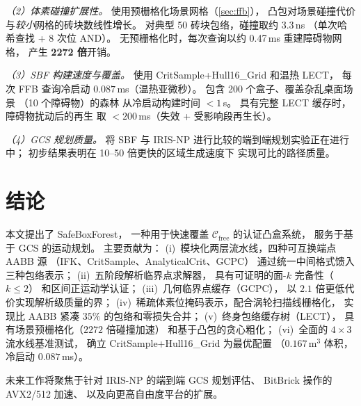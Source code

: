 \documentclass[journal]{IEEEtran}
\newcommand{\Cfree}{\mathcal{C}_\text{free}}
\begin{document}
\emph{（2）体素碰撞扩展性。}
使用预栅格化场景网格（\cref{sec:ffb}），
凸包对场景碰撞代价与\emph{较小}网格的砖块数线性增长。
对典型 50 砖块包络，碰撞取约 3.3\,ns
（单次哈希查找 + 8 次位 AND）。
无预栅格化时，每次查询以约 0.47\,ms 重建障碍物网格，
产生 \textbf{2272 倍}开销。

\emph{（3）SBF 构建速度与覆盖。}
使用 CritSample+Hull16\_Grid 和温热 LECT，
每次 FFB 查询冷启动 $0.087$\,ms（温热亚微秒）。
包含 200 个盒子、覆盖杂乱桌面场景
（10 个障碍物）的森林
从冷启动构建时间 $< 1$\,s。
具有完整 LECT 缓存时，障碍物扰动后的再生
取 $< 200$\,ms（失效 + 受影响段再生长）。

\emph{（4）GCS 规划质量。}
将 SBF 与 IRIS-NP 进行比较的端到端规划实验正在进行中；
初步结果表明在 10--50 倍更快的区域生成速度下
实现可比的路径质量。

\section{结论}\label{sec:conclusion}

本文提出了 SafeBoxForest，
一种用于快速覆盖 $\Cfree$ 的认证凸盒系统，
服务于基于 GCS 的运动规划。
主要贡献为：
(i)~模块化两层流水线，四种可互换端点 AABB 源
（IFK、CritSample、AnalyticalCrit、GCPC）
通过统一中间格式馈入三种包络表示；
(ii)~五阶段解析临界点求解器，
具有可证明的面-$k$ 完备性（$k \leq 2$）
和区间正运动学认证；
(iii)~几何临界点缓存（GCPC），
以 $2.1$ 倍更低代价实现解析级质量的界；
(iv)~稀疏体素位掩码表示，配合涡轮扫描线栅格化，
实现比 AABB 紧凑 $35\%$ 的包络和零损失合并；
(v)~终身包络缓存树（LECT），
具有场景预栅格化（$2272$ 倍碰撞加速）
和基于凸包的贪心粗化；
(vi)~全面的 $4{\times}3$ 流水线基准测试，
确立 CritSample+Hull16\_Grid 为最优配置
（$0.167$\,m$^3$ 体积，冷启动 $0.087$\,ms）。

未来工作将聚焦于针对 IRIS-NP 的端到端 GCS 规划评估、
BitBrick 操作的 AVX2/512 加速、
以及向更高自由度平台的扩展。



\end{document}
